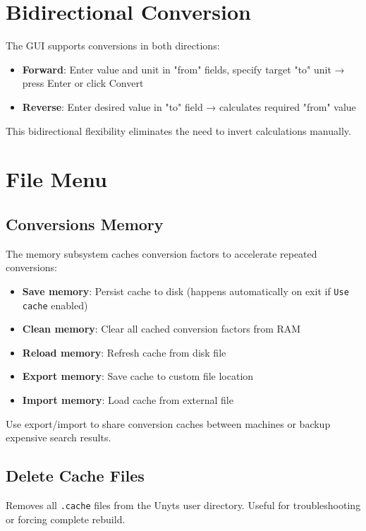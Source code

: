 \documentclass[11pt,a4paper]{report}
\begin{document}
\section{Bidirectional Conversion}

The GUI supports conversions in both directions:

\begin{itemize}
\item \textbf{Forward}: Enter value and unit in "from" fields, specify target "to" unit → press Enter or click Convert
\item \textbf{Reverse}: Enter desired value in "to" field → calculates required "from" value
\end{itemize}

This bidirectional flexibility eliminates the need to invert calculations manually.

\section{File Menu}

\subsection{Conversions Memory}

The memory subsystem caches conversion factors to accelerate repeated conversions:

\begin{itemize}
\item \textbf{Save memory}: Persist cache to disk (happens automatically on exit if \texttt{Use cache} enabled)
\item \textbf{Clean memory}: Clear all cached conversion factors from RAM
\item \textbf{Reload memory}: Refresh cache from disk file
\item \textbf{Export memory}: Save cache to custom file location
\item \textbf{Import memory}: Load cache from external file
\end{itemize}

Use export/import to share conversion caches between machines or backup expensive search results.

\subsection{Delete Cache Files}

Removes all \texttt{.cache} files from the Unyts user directory. Useful for troubleshooting or forcing complete rebuild.
\end{document}

